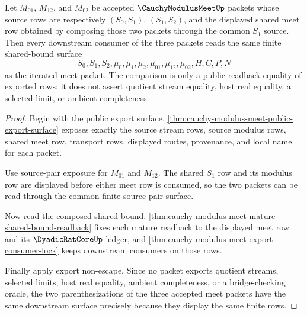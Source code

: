 \begin{theorem}
\label{thm:cauchy-modulus-meet-modulus-meet-associativity}
Let $M_{01}$, $M_{12}$, and $M_{02}$ be accepted $\CauchyModulusMeetUp$ packets whose source rows are respectively $(S_0,S_1)$, $(S_1,S_2)$, and the displayed shared meet row obtained by composing those two packets through the common $S_1$ source. Then every downstream consumer of the three packets reads the same finite shared-bound surface
$$
S_0,S_1,S_2,\mu_0,\mu_1,\mu_2,\mu_{01},\mu_{12},\mu_{02},H,C,P,N
$$
as the iterated meet packet. The comparison is only a public readback equality of exported rows; it does not assert quotient stream equality, host real equality, a selected limit, or ambient completeness.
\end{theorem}
\begin{proof}
Begin with the public export surface. \autoref{thm:cauchy-modulus-meet-public-export-surface} exposes exactly the source stream rows, source modulus rows, shared meet row, transport rows, displayed routes, provenance, and local name for each packet.

Use source-pair exposure for $M_{01}$ and $M_{12}$. The shared $S_1$ row and its modulus row are displayed before either meet row is consumed, so the two packets can be read through the common finite source-pair surface.

Now read the composed shared bound. \autoref{thm:cauchy-modulus-meet-mature-shared-bound-readback} fixes each mature readback to the displayed meet row and its $\DyadicRatCoreUp$ ledger, and \autoref{thm:cauchy-modulus-meet-export-consumer-lock} keeps downstream consumers on those rows.

Finally apply export non-escape. Since no packet exports quotient streams, selected limits, host real equality, ambient completeness, or a bridge-checking oracle, the two parenthesizations of the three accepted meet packets have the same downstream surface precisely because they display the same finite rows.
\end{proof}

